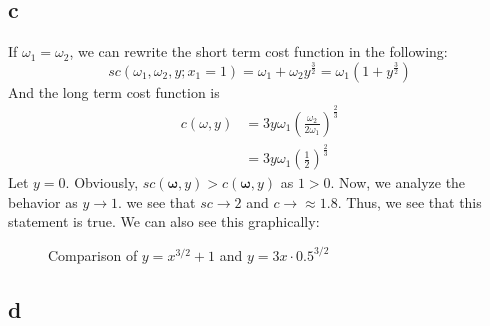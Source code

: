 \documentclass[11pt]{article}
\begin{document}
\subsection*{c}
If $\omega_1 = \omega_2$, we can rewrite the short term cost function in the following:
\[
    sc(\omega_1, \omega_2, y; x_1 = 1) = \omega_1 + \omega_2 y^\frac{3}{2} = \omega_1(1 + y^\frac{3}{2})
\]
And the long term cost function is
\begin{align*}
    c(\omega, y) &= 3y \omega_1 \left( \frac{\omega_2}{2\omega_1} \right)^\frac{2}{3}\\
    &= 3y \omega_1 \left( \frac{1}{2} \right)^\frac{2}{3}
\end{align*}
Let $y = 0$. Obviously, $sc(\mathbf{\omega}, y) > c(\mathbf{\omega}, y)$ as $1 > 0$. Now, we analyze the behavior as $y \to 1$. we see that $sc \to 2$ and $c \to \approx 1.8$. Thus, we see that this statement is true. We can also see this graphically:
\begin{figure}[H]
    \centering
    \caption{Comparison of $y = x^{3/2} + 1$ and $y = 3x \cdot 0.5^{3/2}$}
    \label{fig:comparison}
\end{figure}
\subsection*{d}
\end{document}
